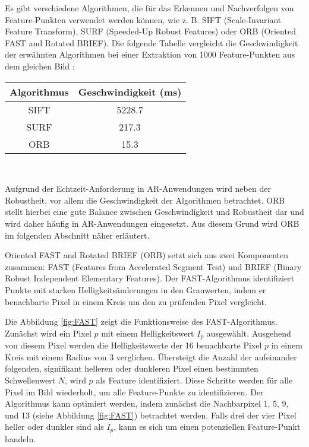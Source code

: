 Es gibt verschiedene Algorithmen, die für das Erkennen und Nachverfolgen von Feature-Punkten verwendet werden können, wie z. B. SIFT (Scale-Invariant Feature Transform), SURF (Speeded-Up Robust Features) oder ORB (Oriented FAST and Rotated BRIEF). Die folgende Tabelle vergleicht die Geschwindigkeit der erwähnten Algorithmen bei einer Extraktion von 1000 Feature-Punkten aus dem gleichen Bild \cite{gao2021vSLAM}:

\begin{center}
    \begin{tabular}{ |c|c| } 
        \hline
        Algorithmus & Geschwindigkeit (ms) \\
        \hline
        SIFT & 5228.7 \\
        SURF & 217.3 \\
        ORB & 15.3 \\
        \hline
    \end{tabular} \\
    \cite{gao2021vSLAM}
\end{center}

Aufgrund der Echtzeit-Anforderung in AR-Anwendungen wird neben der Robustheit, vor allem die Geschwindigkeit der Algorithmen betrachtet. ORB stellt hierbei eine gute Balance zwischen Geschwindigkeit und Robustheit dar und wird daher häufig in AR-Anwendungen eingesetzt. Aus diesem Grund wird ORB im folgenden Abschnitt näher erläutert. \cite{gao2021vSLAM, rublee2011orb}

Oriented FAST and Rotated BRIEF (ORB) setzt sich aus zwei Komponenten zusammen: FAST (Features from Accelerated Segment Test) und BRIEF (Binary Robust Independent Elementary Features). Der FAST-Algorithmus identifiziert Punkte mit starken Helligkeitsänderungen in den Grauwerten, indem er benachbarte Pixel in einem Kreis um den zu prüfenden Pixel vergleicht. \cite{gao2021vSLAM, rublee2011orb}

Die Abbildung \ref{fig:FAST} zeigt die Funktionsweise des FAST-Algorithmus. Zunächst wird ein Pixel \( p \) mit einem Helligkeitswert \( I_p \) ausgewählt. Ausgehend von diesem Pixel werden die Helligkeitswerte der 16 benachbarte Pixel \( p \) in einem Kreis mit einem Radius von 3 verglichen. Übersteigt die Anzahl der aufeinander folgenden, signifikant helleren oder dunkleren Pixel einen bestimmten Schwellenwert \( N \), wird \( p \) als Feature identifiziert. Diese Schritte werden für alle Pixel im Bild wiederholt, um alle Feature-Punkte zu identifizieren. Der Algorithmus kann optimiert werden, indem zunächst die Nachbarpixel 1, 5, 9, und 13 (siehe Abbildung \ref{fig:FAST}) betrachtet werden. Falls drei der vier Pixel heller oder dunkler sind als \( I_p \), kann es sich um einen potenziellen Feature-Punkt handeln. \cite{gao2021vSLAM, rosten2006fast}

